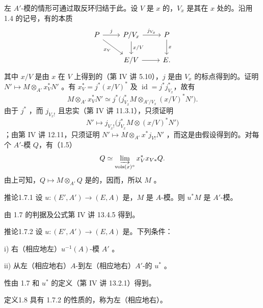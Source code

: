 左 $A'$-模的情形可通过取反环归结于此。设 $V$ 是 $x$ 的，$V_x$ 是其在 $x$ 处的。沿用 1.4 的记号，有的本质
\[
\begin{tikzcd}
 P\arrow[r,"j"]\arrow[dr,"x_V"']&P/V_x\arrow[r,"j_{V_x}"]\arrow[d,"x/V"]&P\arrow[d,"x"]\\
 &E/V\arrow[r]&E.
\end{tikzcd}
\]
其中 $x/V$ 是由 $x$ 在 $V$ 上得到的（第 IV 讲 5.10），$j$ 是由 $V_x$ 的标点得到的。证明 $N'\mapsto M\otimes_{A'}x_V^*N'$ 。有 $x_V^*=j^*(x/V)^*$ 及 $\operatorname{id}=j^*j_{V_x}^*$，故有
\[
 M\otimes_{A'}x_V^*N'\simeq j^*\bigl(j_{V_x}^*M\otimes_{A'/V_x}(x/V)^*N'\bigr).
\]
由于 $j^*$ ，而 $j_{V_x!}$ 且忠实（第 IV 讲 11.3.1），只须证明
\[
 N'\longmapsto j_{V_x!}\bigl(j_{V_x}^*M\otimes(x/V)^*N'\bigr)
\]
；由第 IV 讲 12.11，只须证明 $N'\mapsto M\otimes_{A'}x^*j_{V!}N'$ ，而这是由假设得到的。对每个 $A'$-模 $Q$，有（1.5）
\[
 Q\simeq\varinjlim_{\operatorname{vois}(x)^\circ}x_V^*x_{V*}Q.
\]
由上可知，$Q\mapsto M\otimes_{A'}Q$ 是的，因而，所以 $M$ 。
\begin{SGAresult}{推论}{1.7.1}
设 $u:(E',A')\to(E,A)$ 是，$M$ 是 $A$-模。则 $u^*M$ 是 $A'$-模。
\end{SGAresult}
由 1.7 的判据及公式第 IV 讲 13.4.5 得到。
\begin{SGAresult}{推论}{1.7.2}
设 $u:(E',A')\to(E,A)$ 是。下列条件：

\noindent i) 右（相应地左）$u^{-1}(A)$-模 $A'$ 。

\noindent ii) 从左（相应地右）$A$-到左（相应地右）$A'$-的 $u^*$ 。
\end{SGAresult}
性由 1.7 和 $u^*$ 的定义（第 IV 讲 13.2.1）得到。
\begin{SGAresult}{定义}{1.8}
具有 1.7.2 的性质的，称为左（相应地右）。
\end{SGAresult}
